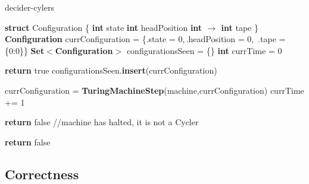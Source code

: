 \begin{algorithm}
        \caption{{\sc decider-cylers}}\label{alg:cyclers}

        \begin{algorithmic}[1]

                \State \textbf{struct} Configuration \{
                \State \tabi\textbf{int} state
                \State \tabi\textbf{int} headPosition
                \State \tabi\textbf{int $\boldsymbol{\to}$ int} tape
                \State \}
                \State
                \State \textbf{Configuration} currConfiguration = \{.state = 0,$\,$.headPosition = 0,$\,$ .tape = \{0:0\}\}
                \State \textbf{Set$\boldsymbol{<}$Configuration$\boldsymbol{>}$} configurationsSeen = \{\}
                \State \textbf{int} currTime = 0

                \State \textbf{return} true
                \EndIf
                \State configurationsSeen.\textbf{insert}(currConfiguration)

                \State currConfiguration = \textbf{TuringMachineStep}(machine,currConfiguration)
                \State currTime += 1


                \State \textbf{return} false //machine has halted, it is not a Cycler
                \EndIf
                \EndWhile

                \State \textbf{return} false
                \EndProcedure

        \end{algorithmic}
\end{algorithm}

\subsection{Correctness}




